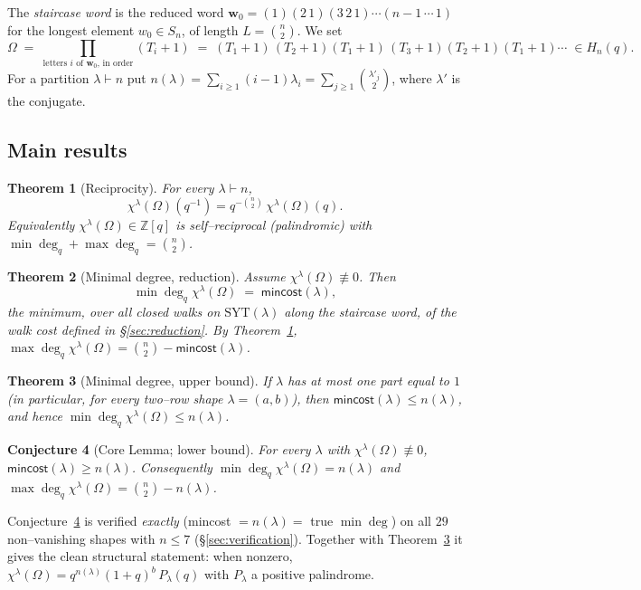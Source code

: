 \documentclass[11pt]{article}
\newtheorem{theorem}{Theorem}
\newtheorem{conjecture}[theorem]{Conjecture}
\theoremstyle{definition}
\newcommand{\Hn}{H_n(q)}
\newcommand{\SYT}{\mathrm{SYT}}
\newcommand{\qinv}{q^{-1}}
\begin{document}
The \emph{staircase word} is the reduced word
$\mathbf w_0=(1)(2\,1)(3\,2\,1)\cdots(n{-}1\,\cdots\,1)$ for the longest
element $w_0\in S_n$, of length $L=\binom n2$. We set
\begin{equation}\label{eq:Omega}
\Omega \;=\; \prod_{\text{letters $i$ of $\mathbf w_0$, in order}}(T_i+1)
\;=\;(T_1+1)\,(T_2+1)(T_1+1)\,(T_3+1)(T_2+1)(T_1+1)\cdots\;\in\Hn .
\end{equation}
For a partition $\lambda\vdash n$ put
$n(\lambda)=\sum_{i\ge1}(i-1)\lambda_i=\sum_{j\ge1}\binom{\lambda'_j}{2}$,
where $\lambda'$ is the conjugate.

\subsection{Main results}

\begin{theorem}[Reciprocity]\label{thm:A}
For every $\lambda\vdash n$,
\[
\chi^\lambda(\Omega)(\qinv)=q^{-\binom n2}\,\chi^\lambda(\Omega)(q).
\]
Equivalently $\chi^\lambda(\Omega)\in\mathbb Z[q]$ is self--reciprocal
(palindromic) with $\min\deg_q+\max\deg_q=\binom n2$.
\end{theorem}

\begin{theorem}[Minimal degree, reduction]\label{thm:B-red}
Assume $\chi^\lambda(\Omega)\not\equiv0$. Then
\[
\min\deg_q\chi^\lambda(\Omega)\;=\;\mathsf{mincost}(\lambda),
\]
the minimum, over all closed walks on $\SYT(\lambda)$ along the staircase
word, of the walk cost defined in \S\ref{sec:reduction}. By
Theorem~\ref{thm:A}, $\max\deg_q\chi^\lambda(\Omega)=\binom n2-\mathsf{mincost}(\lambda)$.
\end{theorem}

\begin{theorem}[Minimal degree, upper bound]\label{thm:B-ub}
If $\lambda$ has at most one part equal to $1$ (in particular, for every
two--row shape $\lambda=(a,b)$), then $\mathsf{mincost}(\lambda)\le n(\lambda)$,
and hence $\min\deg_q\chi^\lambda(\Omega)\le n(\lambda)$.
\end{theorem}

\begin{conjecture}[Core Lemma; lower bound]\label{conj:core}
For every $\lambda$ with $\chi^\lambda(\Omega)\not\equiv0$,
$\mathsf{mincost}(\lambda)\ge n(\lambda)$. Consequently
$\min\deg_q\chi^\lambda(\Omega)=n(\lambda)$ and
$\max\deg_q\chi^\lambda(\Omega)=\binom n2-n(\lambda)$.
\end{conjecture}
Conjecture~\ref{conj:core} is verified \emph{exactly} (mincost $=n(\lambda)=$
true $\min\deg$) on all $29$ non--vanishing shapes with $n\le7$
(\S\ref{sec:verification}). Together with Theorem~\ref{thm:B-ub} it gives the
clean structural statement: when nonzero,
$\chi^\lambda(\Omega)=q^{n(\lambda)}(1+q)^{b}\,P_\lambda(q)$ with $P_\lambda$
a positive palindrome.
\end{document}

